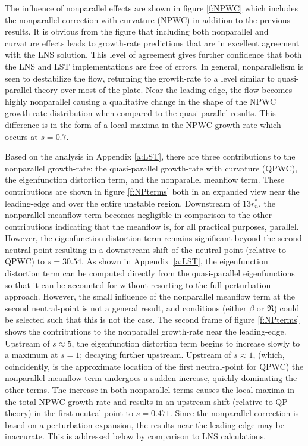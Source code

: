 The influence of nonparallel effects are shown in figure \ref{f:NPWC} which
includes the nonparallel correction with curvature (NPWC) in addition to the
previous results.  It is obvious from the figure that including both
nonparallel and curvature effects leads to growth-rate predictions that are in
excellent agreement with the LNS solution.  This level of agreement gives
further confidence that both the LNS and LST implementations are free of
errors.  In general, nonparallelism is seen to destabilize the flow, returning
the growth-rate to a level similar to quasi-parallel theory over most of the
plate.  Near the leading-edge, the flow becomes highly nonparallel causing a
qualitative change in the shape of the NPWC growth-rate distribution when
compared to the quasi-parallel results.  This difference is in the form of a
local maxima in the NPWC growth-rate which occurs at $s = 0.7$.

Based on the analysis in Appendix \ref{a:LST}, there are three contributions
to the nonparallel growth-rate: the quasi-parallel growth-rate with curvature
(QPWC), the eigenfunction distortion term, and the nonparallel meanflow term.
These contributions are shown in figure \ref{f:NPterms} both in an expanded
view near the leading-edge and over the entire unstable region.  Downstream of
$13 r^*_n$, the nonparallel meanflow term becomes negligible in comparison to
the other contributions indicating that the meanflow is, for all practical
purposes, parallel.  However, the eigenfunction distortion term remains
significant beyond the second neutral-point resulting in a downstream shift of
the neutral-point (relative to QPWC) to $s = 30.54$.  As shown in
Appendix~\ref{a:LST}, the eigenfunction distortion term can be computed
directly from the quasi-parallel eigenfunctions so that it can be accounted
for without resorting to the full perturbation approach.  However, the small
influence of the nonparallel meanflow term at the second neutral-point is not
a general result, and conditions (either $\beta$ or $\Re$) could be selected
such that this is not the case.  The second frame of figure \ref{f:NPterms}
shows the contributions to the nonparallel growth-rate near the leading-edge.
Upstream of $s \approx 5$, the eigenfunction distortion term begins to
increase slowly to a maximum at $s=1$; decaying further upstream.  Upstream of
$s \approx 1$, (which, coincidently, is the approximate location of the first
neutral-point for QPWC) the nonparallel meanflow term undergoes a sudden
increase, quickly dominating the other terms.  The increase in both
nonparallel terms causes the local maxima in the total NPWC growth-rate and
results in an upstream shift (relative to QP theory) in the first
neutral-point to $s = 0.471$.  Since the nonparallel correction is based on a
perturbation expansion, the results near the leading-edge may be inaccurate.
This is addressed below by comparison to LNS calculations.

